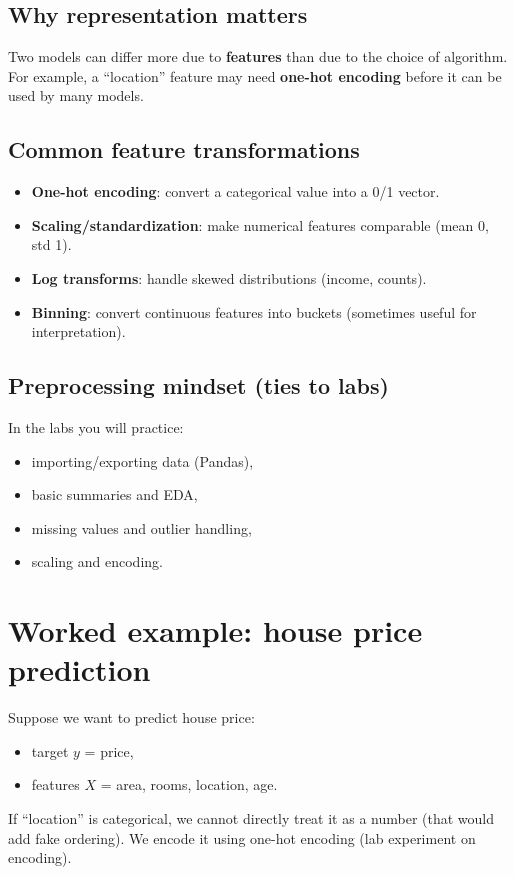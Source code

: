 \documentclass[11pt]{article}
\begin{document}
\subsection{Why representation matters}
Two models can differ more due to \textbf{features} than due to the choice of algorithm.
For example, a ``location'' feature may need \textbf{one-hot encoding} before it can be used by many models.

\subsection{Common feature transformations}
\begin{itemize}[leftmargin=*]
  \item \textbf{One-hot encoding}: convert a categorical value into a 0/1 vector.
  \item \textbf{Scaling/standardization}: make numerical features comparable (mean 0, std 1).
  \item \textbf{Log transforms}: handle skewed distributions (income, counts).
  \item \textbf{Binning}: convert continuous features into buckets (sometimes useful for interpretation).
\end{itemize}

\subsection{Preprocessing mindset (ties to labs)}
In the labs you will practice:
\begin{itemize}[leftmargin=*]
  \item importing/exporting data (Pandas),
  \item basic summaries and EDA,
  \item missing values and outlier handling,
  \item scaling and encoding.
\end{itemize}

\section{Worked example: house price prediction}
Suppose we want to predict house price:
\begin{itemize}[leftmargin=*]
  \item target $y$ = price,
  \item features $X$ = area, rooms, location, age.
\end{itemize}
If ``location'' is categorical, we cannot directly treat it as a number (that would add fake ordering). We encode it using one-hot encoding (lab experiment on encoding).
\end{document}
